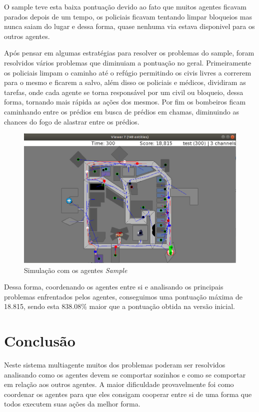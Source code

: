 \documentclass[conference]{IEEEtran}
\begin{document}
O sample teve esta baixa pontuação devido ao fato que muitos agentes ficavam parados depois de um tempo, os policiais ficavam tentando limpar bloqueios mas nunca saiam do lugar e dessa forma, quase nenhuma via estava disponivel para os outros agentes.

Após pensar em algumas estratégias para resolver os problemas do sample, foram resolvidos vários problemas que diminuiam a pontuação no geral. Primeiramente os policiais limpam o caminho até o refúgio permitindo os civis livres a correrem para o mesmo e ficarem a salvo, além disso os policiais e médicos, dividiram as tarefas, onde cada agente se torna responsável por um civil ou bloqueio, dessa forma, tornando mais rápida as ações dos mesmos. Por fim os bombeiros ficam caminhando entre os prédios em busca de prédios em chamas, diminuindo as chances do fogo de alastrar entre os prédios.

\begin{figure}[htbp]
\centerline{\includegraphics[scale=0.27]{fig5.png}}
\caption{Simulação com os agentes \textit{Sample}}
\label{fig5}
\end{figure}

Dessa forma, coordenando os agentes entre si e analisando os principais problemas enfrentados pelos agentes, conseguimos uma pontuação máxima de 18.815, sendo esta 838.08\% maior que a pontuação obtida na versão inicial.

\section{Conclusão}
Neste sistema multiagente muitos dos problemas poderam ser resolvidos analisando como os agentes devem se comportar sozinhos e como se comportar em relação aos outros agentes. A maior dificuldade provavelmente foi como coordenar os agentes para que eles consigam cooperar entre si de uma forma que todos executem suas ações da melhor forma.
\end{document}
